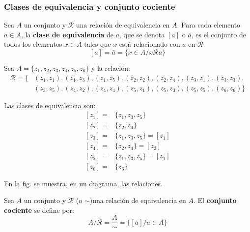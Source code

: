 \subsubsection{Clases de equivalencia y conjunto cociente}
\vspace{3mm}
\begin{fmd-definition}
	Sea $A$ un conjunto y $\mathcal{R}$ una relación de equivalencia en $A$. Para cada elemento $a \in A$, la \textbf{clase de equivalencia} de $a$, que se denota $[a]$ o $\bar{a}$, es el conjunto de todos los elementos $x \in A$ tales que $x$ está relacionado con $a$ en $\mathcal{R}$.
	\[ [a] = \bar{a} = \{ x \in A / x \mathcal{R} a \}\]
\end{fmd-definition}

\begin{fmd-example}
	Sea $A = \{ z_1, z_2, z_3, z_4, z_5, z_6 \}$ y la relación:
	\[ \begin{split}
		\mathcal{R} = \{ & (z_1, z_1), (z_1, z_3), (z_1, z_5), (z_2, z_2), (z_2, z_4), (z_3, z_1), (z_3, z_3),\\
		& (z_3, z_5), (z_4, z_2), (z_4, z_4), (z_5, z_1), (z_5, z_3), (z_5, z_5), (z_6, z_6) \}
	\end{split} \]
	
\begin{minipage}{.45\textwidth}
	Las clases de equivalencia son:
	\[ \begin{split}
		[z_1] =& \{ z_1, z_3, z_5 \}\\
		[z_2] = & \{ z_2, z_4 \}\\
		[z_3] = & \{ z_1, z_3, z_5 \} = [z_1]\\
		[z_4] = & \{ z_2, z_4 \} = [z_2]\\
		[z_5] = & \{ z_1, z_3, z_5 \} = [z_1]\\
		[z_6] = & \{ z_6\}
	\end{split} \]
\end{minipage}
\begin{minipage}{.45\textwidth}
	\begin{figure}[H]
		\centering
		
		\caption*{}
		\label{fig:clases1}
	\end{figure}
\end{minipage}

En la fig. se muestra, en un diagrama, las relaciones.
\label{ex:clases1}
\end{fmd-example}

\begin{fmd-definition}
	Sea $A$ un conjunto y $\mathcal{R}$ (o $\sim$)una relación de equivalencia en $A$. El \textbf{conjunto cociente} se define por:
	\[ A/\mathcal{R} = \frac{A}{\sim} = \{ [a] / a \in A \}\]
\end{fmd-definition}

